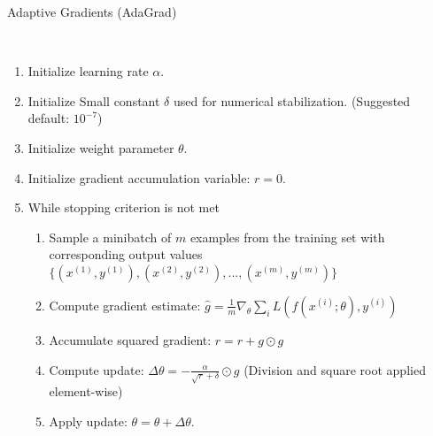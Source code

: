 \begin{algorithm}
	\caption{Adaptive Gradients (AdaGrad)  \cite{goodfellow2016deep}}\label{alg:adaGrad}
	\begin{algorithmic}
		\\
		\begin{enumerate}
			\item Initialize learning rate $\alpha$.		
			\item Initialize Small constant $\delta$ used for numerical stabilization. (Suggested default: $10^{-7}$)
			\item Initialize weight parameter $\theta$.
			\item Initialize gradient accumulation variable: $r = 0$.
			\item While stopping criterion is not met
			\begin{enumerate}[label=\emph{\alph*})]
				\item Sample a minibatch of $m$ examples from the training set with corresponding output values
				$\{(x^{(1)}, y^{(1)}), (x^{(2)}, y^{(2)}), ..., (x^{(m)}, y^{(m)})\}$
				\item Compute gradient estimate: $\hat{g} = \frac{1}{m} \nabla_\theta \sum_i L(f(x^{(i)};\theta), y^{(i)})$
				\item Accumulate squared gradient: $r = r + g \odot g$
				\item Compute update: $\Delta \theta = - \frac{\alpha}{\sqrt{r} + \delta} \odot g$ (Division and square root applied element-wise)
				\item Apply update: $\theta = \theta + \Delta \theta$.
			\end{enumerate}
		\end{enumerate}
	\end{algorithmic}
\end{algorithm}

